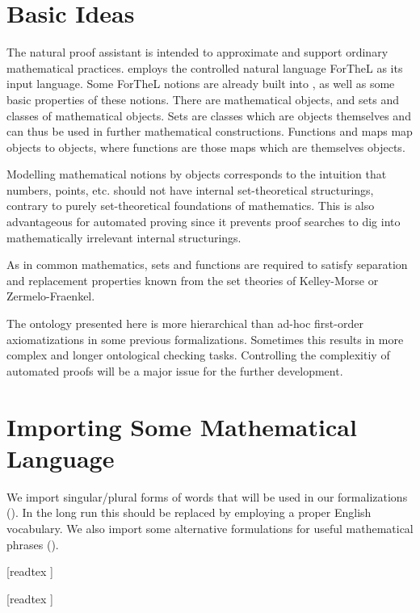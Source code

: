 \documentclass{article}
\begin{document}
\section{Basic Ideas}

The natural proof assistant \Naproche is intended to
approximate and support ordinary mathematical practices.
\Naproche employs the controlled natural language ForTheL
as its input language. Some ForTheL notions are already
built into \Naproche, as well as some basic properties of
these notions.
There are
mathematical objects, and sets and classes of mathematical
objects. Sets are classes which are objects themselves and
can thus be used in further mathematical constructions. Functions
and maps map objects to objects, where functions are those
maps which are themselves objects.

Modelling mathematical notions by objects corresponds
to the intuition that numbers, points, etc. should
not have internal set-theoretical
structurings, contrary to purely set-theoretical
foundations of mathematics. This is also advantageous
for automated proving since it prevents proof searches to
dig into mathematically irrelevant internal structurings.

As in common mathematics, sets and functions are required to
satisfy separation and replacement properties known from the
set theories of Kelley-Morse or Zermelo-Fraenkel.

The ontology presented here is more hierarchical than
ad-hoc first-order axiomatizations in some previous
\Naproche formalizations. Sometimes
this results in more complex and longer ontological checking tasks.
Controlling the complexitiy of automated proofs will be a major
issue for the further development.


\section{Importing Some Mathematical Language}

We import singular/plural forms of words that will be used in
our formalizations ().
In the long run this should be replaced by
employing a proper English vocabulary. We also
import some alternative formulations for
useful mathematical phrases ().

\begin{forthel}

  [readtex ]

  [readtex ]
\end{forthel}
\end{document}
